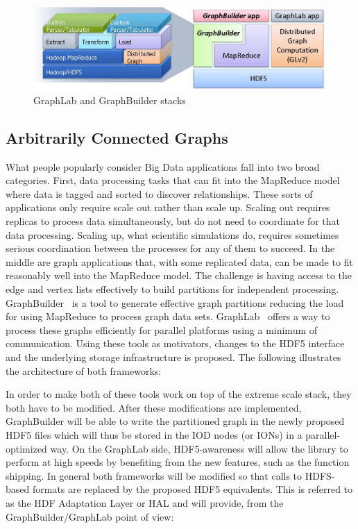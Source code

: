 \documentclass[conference]{IEEEtran} \pdfpagewidth=8.5in
\begin{document}
\begin{figure}[htbp]
\centering
\includegraphics[width=\columnwidth]{images/graphlab-and-graphbuilder.png}
\caption{GraphLab and GraphBuilder stacks}
\label{fig:graphlab-graphbuilder}
\end{figure}

\subsection{Arbitrarily Connected Graphs}
\label{sec:acg}

What people popularly consider Big Data applications fall into two broad
categories. First, data processing tasks that can fit into the MapReduce model
where data is tagged and sorted to discover relationships. These sorts of
applications only require scale out rather than scale up. Scaling out requires
replicas to process data simultaneously, but do not need to coordinate for that
data processing. Scaling up, what scientific simulations do, requires sometimes
serious coordination between the processes for any of them to succeed. In the
middle are graph applications that, with some replicated data, can be made to
fit reasonably well into the MapReduce model. The challenge is having access to
the edge and vertex lists effectively to build partitions for independent
processing. GraphBuilder~\cite{Jain:2013:GraphBuilder} is a tool to generate
effective graph partitions reducing the load for using MapReduce to process
graph data sets. GraphLab~\cite{Low:2012:GraphLab} offers a way to process
these graphs efficiently for parallel platforms using a minimum of
communication. Using these tools as motivators, changes to the HDF5 interface
and the underlying storage infrastructure is proposed.  The following
illustrates the architecture of both frameworks:

In order to make both of these tools work on top of the extreme scale stack,
they both have to be modified. After these modifications are implemented,
GraphBuilder will be able to write the partitioned graph in the newly proposed
HDF5 files which will thus be stored in the IOD nodes (or IONs) in a
parallel-optimized way. On the GraphLab side, HDF5-awareness will allow
the library to perform at high speeds by benefiting from the new
features, such as the function shipping. In general both frameworks will be
modified so that calls to HDFS-based formats are replaced by the proposed HDF5
equivalents. This is referred to as the HDF Adaptation Layer or HAL and will
provide, from the GraphBuilder/GraphLab point of view:
\end{document}
